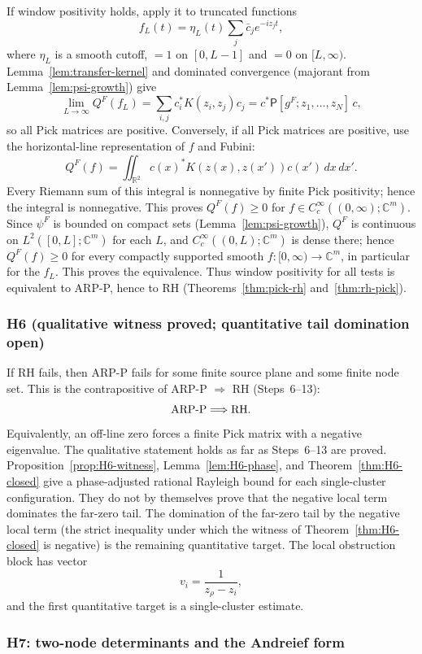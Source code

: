 \documentclass[11pt]{amsart}
\theoremstyle{definition}
\theoremstyle{remark}
\theoremstyle{definition}
\newcommand{\R}{\mathbb{R}}
\newcommand{\C}{\mathbb{C}}
\begin{document}
If window positivity holds, apply it to truncated functions
\[
   f_L(t)=\eta_L(t)\sum_j \bar c_j e^{-iz_jt},
\]
where $\eta_L$ is a smooth cutoff, $=1$ on $[0,L-1]$ and $=0$ on $[L,\infty)$.  Lemma~\ref{lem:transfer-kernel}
and dominated convergence (majorant from Lemma~\ref{lem:psi-growth}) give
\[
   \lim_{L\to\infty}Q^F(f_L)
   =
   \sum_{i,j}c_i^*K(z_i,z_j)c_j=c^*\mathsf P[g^F;z_1,\ldots,z_N]\,c,
\]
so all Pick matrices are positive.  Conversely, if all Pick matrices are positive, use the horizontal-line
representation of $f$ and Fubini:
\[
   Q^F(f)=
   \iint_{\R^2}c(x)^*K(z(x),z(x'))c(x')\,dx\,dx'.
\]
Every Riemann sum of this integral is nonnegative by finite Pick positivity; hence the integral is
nonnegative.  This proves $Q^F(f)\ge0$ for $f\in C_c^\infty((0,\infty);\C^m)$.  Since $\psi^F$ is
bounded on compact sets (Lemma~\ref{lem:psi-growth}), $Q^F$ is continuous on $L^2([0,L];\C^m)$ for each
$L$, and $C_c^\infty((0,L);\C^m)$ is dense there; hence $Q^F(f)\ge0$ for every compactly supported
smooth $f:[0,\infty)\to\C^m$, in particular for the $f_L$.  This proves the equivalence.  Thus window positivity for all tests is equivalent to ARP-P, hence to RH
(Theorems~\ref{thm:pick-rh} and~\ref{thm:rh-pick}).

\subsubsection*{H6 (qualitative witness proved; quantitative tail domination open)}

If RH fails, then ARP-P fails for some finite source plane and some finite node set.  This is the
contrapositive of ARP-P $\Rightarrow$ RH (Steps~6--13):
\[
   \textnormal{ARP-P}\Longrightarrow\textnormal{RH}.
\]
Equivalently, an off-line zero forces a finite Pick matrix with a negative eigenvalue.  The qualitative
statement holds as far as Steps~6--13 are proved.  Proposition~\ref{prop:H6-witness}, Lemma~\ref{lem:H6-phase}, and
Theorem~\ref{thm:H6-closed} give a phase-adjusted rational Rayleigh bound for each single-cluster
configuration.  They do not by themselves prove that the negative local term dominates the far-zero
tail.  The domination of the far-zero tail by the negative local term (the strict inequality
under which the witness of Theorem~\ref{thm:H6-closed} is negative) is the remaining quantitative target.  The
local obstruction block has vector
\[
   v_i=\frac1{z_\rho-z_i},
\]
and the first quantitative target is a single-cluster estimate.

\subsubsection*{H7: two-node determinants and the Andreief form}
\end{document}
